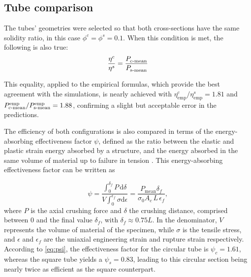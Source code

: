 \documentclass[12pt,number,preprint,review,times]{elsarticle}
\begin{document}
\subsection{Tube comparison}

The tubes' geometries were selected so that both cross-sections have the same solidity ratio, in this case $\phi^c = \phi^s = 0.1$. When this condition is met, the following is also true: 
\begin{equation}
\frac{\eta^c}{\eta^s} = \frac{P^{\mathrm{}}_{\mathrm{c{\text -}mean}}}{P^{\mathrm{}}_{\mathrm{s{\text -}mean}}}    
\end{equation}

This equality, applied to the empirical formulas, which provide the best agreement with the simulations, is nearly achieved with ${\eta_{\mathrm{emp}}^c}/\eta_{\mathrm{emp}}^s=1.81$ and ${P^{\mathrm{emp}}_{\mathrm{c{\text -}mean}}}/{P^{\mathrm{emp}}_{\mathrm{s{\text -}mean}}} = 1.88$, confirming a slight but acceptable error in the predictions.

The efficiency of both configurations is also compared in terms of the energy-absorbing effectiveness factor $\psi$, defined as the ratio between the elastic and plastic strain energy absorbed by a structure, and the energy absorbed in the same volume of material up to failure in tension \citep{hsu2004quasi,jones2005energy,jones2010energy}. This energy-absorbing effectiveness factor can be written as

\begin{equation}
\psi = \frac{\int_0^{\delta_f} P \, \mathrm{d}\delta}{V \int_0^{\epsilon_f} \sigma \mathrm{d}\epsilon} = \frac{P^{\mathrm{}}_{\mathrm{mean}} \delta_f}{\sigma_0 A_c \, L \, \epsilon_f}, 
\label{eq:psi}
\end{equation}
where $P$ is the axial crushing force and $\delta$ the crushing distance, comprised between 0 and the final value $\delta_f$, with $\delta_f \approx 0.75 L$. In the denominator, $V$ represents the volume of material of the specimen, while $\sigma$ is the tensile stress, and $\epsilon$ and $\epsilon_f$ are the uniaxial engineering strain and rupture strain respectively. According to \cref{eq:psi}, the effectiveness factor for the circular tube is $\psi_c = 1.61$, whereas the square tube yields a $\psi_s = 0.83$, leading to this circular section being nearly twice as efficient as the square counterpart.
\end{document}
